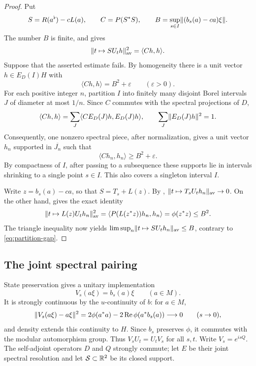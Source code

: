 \begin{proof}
Put
\[
 S=R(a^\flat)-cL(a),\qquad
 C=P(S^*S),\qquad
 B=\sup_{s\in I}\lVert(b_s(a)-ca)\xi\rVert.
\]
The number $B$ is finite, and  gives
\[
 \lVert t\mapsto SU_th\rVert_{\mathrm{av}}^2=\langle Ch,h\rangle.
\]
Suppose that the asserted estimate fails. By homogeneity there is a unit
vector $h\in E_D(I)H$ with
\[
 \langle Ch,h\rangle=B^2+\varepsilon
 \qquad(\varepsilon>0).
\]
For each positive integer $n$, partition $I$ into finitely many disjoint
Borel intervals $J$ of diameter at most $1/n$. Since $C$ commutes with the
spectral projections of $D$,
\[
 \langle Ch,h\rangle
   =\sum_J\langle C E_D(J)h,E_D(J)h\rangle,
 \qquad
 \sum_J\lVert E_D(J)h\rVert^2=1.
\]
Consequently, one nonzero spectral piece, after normalization, gives a unit
vector $h_n$ supported in $\overline{J_n}$ such that
\begin{equation}
 \langle Ch_n,h_n\rangle\geq B^2+\varepsilon.
 \label{eq:partition-gap}
\end{equation}
By compactness of $I$, after passing to a subsequence these supports lie in
intervals shrinking to a single point $s\in I$. This also covers a singleton
interval $I$.

Write $z=b_s(a)-ca$, so that $S=T_s+L(z)$. By ,
$\lVert t\mapsto T_sU_th_n\rVert_{\mathrm{av}}\to0$. On the other hand,
 gives the exact identity
\[
 \lVert t\mapsto L(z)U_th_n\rVert_{\mathrm{av}}^2
 =\langle P(L(z^*z))h_n,h_n\rangle
 =\phi(z^*z)\leq B^2.
\]
The triangle inequality now yields
$\limsup_n\lVert t\mapsto SU_th_n\rVert_{\mathrm{av}}\leq B$, contrary to
\eqref{eq:partition-gap}.
\end{proof}

\subsection{The joint spectral pairing}

State preservation gives a unitary implementation
\[
 V_s(a\xi)=b_s(a)\xi\qquad(a\in M).
\]
It is strongly continuous by the $u$-continuity of $b$: for $a\in M$,
\[
 \lVert V_s(a\xi)-a\xi\rVert^2
 =2\phi(a^*a)-2\operatorname{Re}\phi(a^*b_s(a))\longrightarrow0
 \qquad(s\to0),
\]
and density extends this continuity to $H$. Since $b_s$ preserves $\phi$,
it commutes with the modular automorphism group. Thus $V_sU_t=U_tV_s$
for all $s,t$.
Write $V_s=e^{isQ}$. The self-adjoint operators $D$ and $Q$ strongly commute;
let $E$ be their joint spectral resolution and let $\mathcal S\subset\mathbb R^2$
be its closed support.

